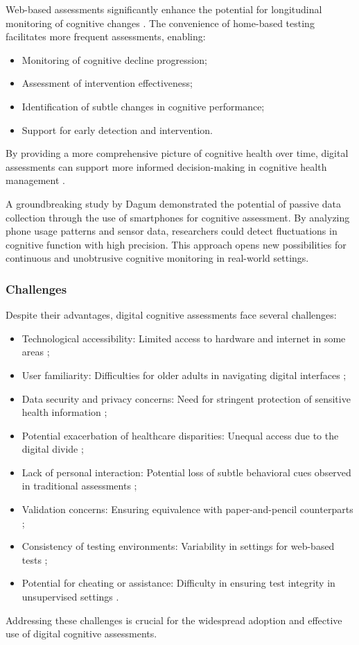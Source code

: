 Web-based assessments significantly enhance the potential for longitudinal monitoring of cognitive changes \cite{Wild2021}. The convenience of home-based testing facilitates more frequent assessments, enabling:
\begin{itemize}
    \item Monitoring of cognitive decline progression;
    \item Assessment of intervention effectiveness;
    \item Identification of subtle changes in cognitive performance;
    \item Support for early detection and intervention.
\end{itemize}
By providing a more comprehensive picture of cognitive health over time, digital assessments can support more informed decision-making in cognitive health management \cite{Zygouris2017}.

A groundbreaking study by Dagum \cite{Dagum2018} demonstrated the potential of passive data collection through the use of smartphones for cognitive assessment. By analyzing phone usage patterns and sensor data, researchers could detect fluctuations in cognitive function with high precision. This approach opens new possibilities for continuous and unobtrusive cognitive monitoring in real-world settings.

\subsubsection{Challenges}
Despite their advantages, digital cognitive assessments face several challenges:
\begin{itemize}
    \item Technological accessibility: Limited access to hardware and internet in some areas \cite{Bauer2012};
    \item User familiarity: Difficulties for older adults in navigating digital interfaces \cite{Zygouris2017};
    \item Data security and privacy concerns: Need for stringent protection of sensitive health information \cite{Bhuyan2017};
    \item Potential exacerbation of healthcare disparities: Unequal access due to the digital divide \cite{Rajkomar2018};
    \item Lack of personal interaction: Potential loss of subtle behavioral cues observed in traditional assessments \cite{Bauer2012};
    \item Validation concerns: Ensuring equivalence with paper-and-pencil counterparts \cite{Wild2021};
    \item Consistency of testing environments: Variability in settings for web-based tests \cite{Geddes2020};
    \item Potential for cheating or assistance: Difficulty in ensuring test integrity in unsupervised settings \cite{Feenstra2017}.
\end{itemize}
Addressing these challenges is crucial for the widespread adoption and effective use of digital cognitive assessments.

